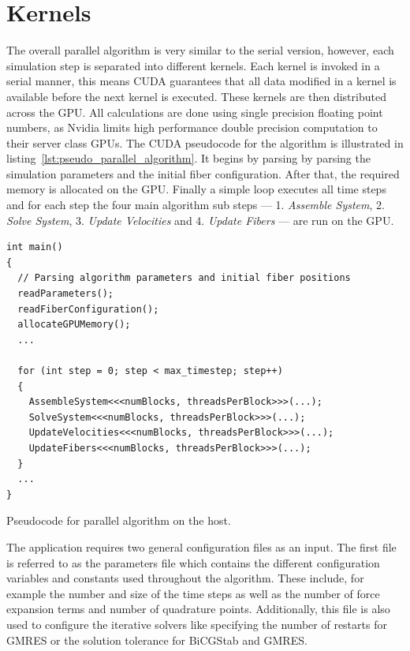 \documentclass[a4paper,11pt]{kth-mag}
\begin{document}
\section{Kernels}
The overall parallel algorithm is very similar to the serial version, however, each simulation step is separated into different kernels. Each kernel is invoked in a serial manner, this means CUDA guarantees that all data modified in a kernel is available before the next kernel is executed. These kernels are then distributed across the GPU. All calculations are done using single precision floating point numbers, as Nvidia limits high performance double precision computation to their server class GPUs. The CUDA pseudocode for the algorithm is illustrated in listing~\ref{lst:pseudo_parallel_algorithm}. It begins by parsing by parsing the simulation parameters and the initial fiber configuration. After that, the required memory is allocated on the GPU. Finally a simple loop executes all time steps and for each step the four main algorithm sub steps — 1. \emph{Assemble System}, 2. \emph{Solve System}, 3. \emph{Update Velocities} and 4. \emph{Update Fibers} — are run on the GPU.

\begin{listing}[!htbp]
  \centering
  \begin{verbatim}
int main()
{
  // Parsing algorithm parameters and initial fiber positions
  readParameters();
  readFiberConfiguration();
  allocateGPUMemory();
  ...

  for (int step = 0; step < max_timestep; step++)
  {
    AssembleSystem<<<numBlocks, threadsPerBlock>>>(...);
    SolveSystem<<<numBlocks, threadsPerBlock>>>(...);
    UpdateVelocities<<<numBlocks, threadsPerBlock>>>(...);
    UpdateFibers<<<numBlocks, threadsPerBlock>>>(...);
  }
  ...
}
  \end{verbatim}
  \caption{Pseudocode for parallel algorithm on the host.}
  \label{lst:pseudo_parallel_algorithm}
\end{listing}

The application requires two general configuration files as an input. The first file is referred to as the parameters file which contains the different configuration variables and constants used throughout the algorithm. These include, for example the number and size of the time steps as well as the number of force expansion terms and number of quadrature points. Additionally, this file is also used to configure the iterative solvers like specifying the number of restarts for GMRES or the solution tolerance for BiCGStab and GMRES.
\end{document}
